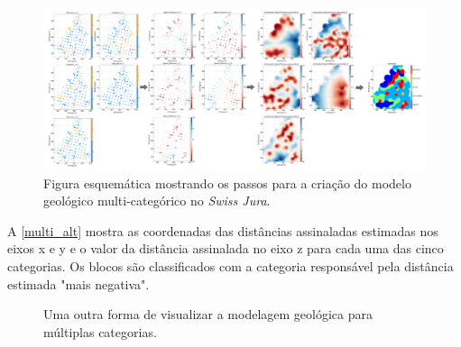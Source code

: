 \begin{figure}[H]
	\centering
	\caption{\label{multicat_jura}Figura esquemática mostrando os passos para a criação do modelo geológico multi-categórico no \textit{Swiss Jura}.}
	\includegraphics[width=\textwidth]{capitulo_2/imagens/multi category implicit modeling.png}
\end{figure}

A \autoref{multi_alt} mostra as coordenadas das distâncias assinaladas estimadas nos eixos x e y e o valor da distância assinalada no eixo z para cada uma das cinco categorias. Os blocos são classificados com a categoria responsável pela distância estimada "mais negativa".

\begin{figure}[H]
	\centering
	\caption{\label{multi_alt}Uma outra forma de visualizar a modelagem geológica para múltiplas categorias.}
	\hspace{1em}
	\hspace{1em}
\end{figure}

